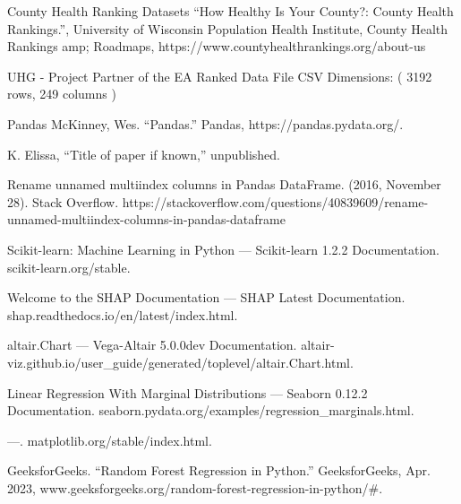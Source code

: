 \documentclass[conference]{IEEEtran}
\begin{document}
\begin{thebibliography}{00}
 County Health Ranking Datasets
“How Healthy Is Your County?: County Health Rankings.”, University of Wisconsin Population Health Institute,
County Health Rankings amp; Roadmaps,
https://www.countyhealthrankings.org/about-us

 UHG - Project Partner of the EA
Ranked Data File CSV Dimensions: ( 3192 rows, 249 columns )

 Pandas
McKinney, Wes. “Pandas.” Pandas, https://pandas.pydata.org/.

 K. Elissa, ``Title of paper if known,'' unpublished.

 Rename unnamed multiindex columns in Pandas DataFrame. (2016, November 28). Stack Overflow. https://stackoverflow.com/questions/40839609/rename-unnamed-multiindex-columns-in-pandas-dataframe

 Scikit-learn: Machine Learning in Python — Scikit-learn 1.2.2 Documentation. scikit-learn.org/stable.

 Welcome to the SHAP Documentation — SHAP Latest Documentation. shap.readthedocs.io/en/latest/index.html.

 altair.Chart — Vega-Altair 5.0.0dev Documentation. altair-viz.github.io/user_guide/generated/toplevel/altair.Chart.html.

 Linear Regression With Marginal Distributions — Seaborn 0.12.2 Documentation. seaborn.pydata.org/examples/regression_marginals.html.

 ---. matplotlib.org/stable/index.html.

 GeeksforGeeks. “Random Forest Regression in Python.” GeeksforGeeks, Apr. 2023, www.geeksforgeeks.org/random-forest-regression-in-python/#.

\end{thebibliography}
\vspace{12pt}
\end{document}
